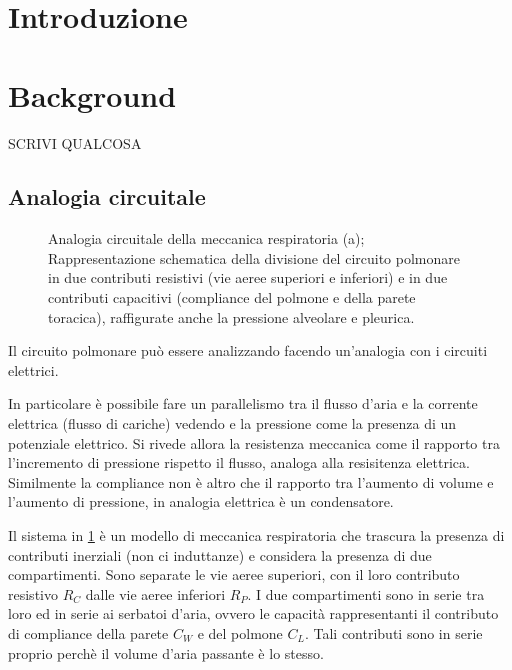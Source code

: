 \section{Introduzione}

\textcolor{blue}{
	\lipsum[1-2]
}

\section{Background}


SCRIVI QUALCOSA

\subsection{Analogia circuitale}

\begin{figure*}[t!]
	\begin{subfigure}{0.5\linewidth}
		\centering
		\small{
			\def\svgwidth{\linewidth}
			}
		\caption{}
		\label{fig:modello}
	\end{subfigure}\hfill
	\begin{subfigure}{0.5\linewidth}
		\centering
		\small{
			\def\svgwidth{0.7\linewidth}
			}
		\caption{}
	\end{subfigure}\hfill
	\caption{Analogia circuitale della meccanica respiratoria \cite{khoo_physiological_2018} (a); Rappresentazione schematica della divisione del circuito polmonare in due contributi resistivi (vie aeree superiori e inferiori) e in due contributi capacitivi (compliance del polmone e della parete toracica), raffigurate anche la pressione alveolare e pleurica.}
\end{figure*}

Il circuito polmonare può essere analizzando facendo un'analogia con i circuiti elettrici.

In particolare è possibile fare un parallelismo tra il flusso d'aria e la corrente elettrica (flusso di cariche) vedendo e la pressione come la presenza di un potenziale elettrico.
Si rivede allora la resistenza meccanica come il rapporto tra l'incremento di pressione rispetto il flusso, analoga alla resisitenza elettrica. Similmente la compliance non è altro che il rapporto tra l'aumento di volume e l'aumento di pressione, in analogia elettrica è un condensatore.

Il sistema in \cref{fig:modello} è un modello di meccanica respiratoria che trascura la presenza di contributi inerziali (non ci induttanze) e considera la presenza di due compartimenti. Sono separate le vie aeree superiori, con il loro contributo resistivo $R_C$ dalle vie aeree inferiori $R_P$. I due compartimenti sono in serie tra loro ed in serie ai serbatoi d'aria, ovvero le capacità rappresentanti il contributo di compliance della parete $C_W$ e del polmone $C_L$. 
Tali contributi sono in serie proprio perchè il volume d'aria passante è lo stesso. 

